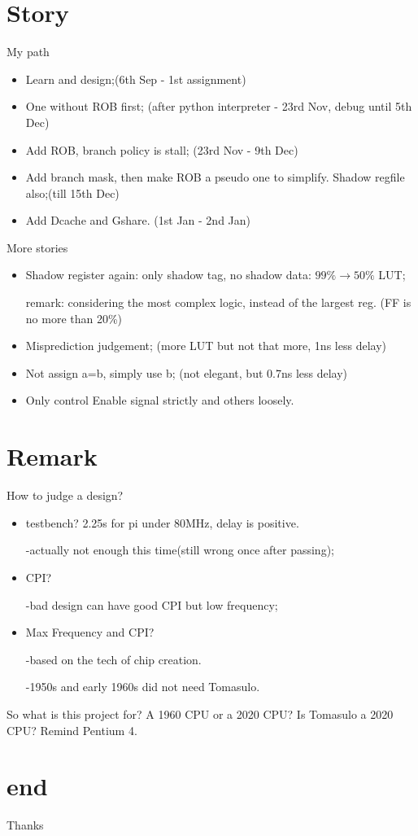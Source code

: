 \documentclass{beamer}
\begin{document}
\section{Story}
\begin{frame}{My path}
    \begin{itemize}
        \item Learn and design;(6th Sep - 1st assignment)
        \item One without ROB first; 
        (after python interpreter - 23rd Nov, debug until 5th Dec)
        \item Add ROB, branch policy is stall; (23rd Nov - 9th Dec)
        \item Add branch mask, then make ROB a pseudo one to simplify. 
        Shadow regfile also;(till 15th Dec) 
        \item Add Dcache and Gshare. (1st Jan - 2nd Jan)
    \end{itemize}
\end{frame}

\begin{frame}{More stories}
    \begin{itemize}
        \item Shadow register again: only shadow tag, no shadow data: $99\%\rightarrow50\%$ LUT; 
        
        remark: considering the most complex logic, instead of the largest reg. (FF is no more than 20\%)

        \item Misprediction judgement; (more LUT but not that more, 1ns less delay)
        \item Not assign a=b, simply use b; (not elegant, but 0.7ns less delay)
        \item Only control Enable signal strictly and others loosely. 
    \end{itemize}
\end{frame}

\section{Remark}
\begin{frame}{How to judge a design?}
    \begin{itemize}
        \item testbench? 2.25s for pi under 80MHz, delay is positive. 
        
        -actually not enough this time(still wrong once after passing);
        \item CPI? 
        
        -bad design can have good CPI but low frequency;

        \item Max Frequency and CPI? 
        
        -based on the tech of chip creation. 

        -1950s and early 1960s did not need Tomasulo. 
    \end{itemize}
    So what is this project for? A 1960 CPU or a 2020 CPU? Is Tomasulo a 2020 CPU? Remind Pentium 4. 
\end{frame}

\section{end}
\begin{frame}
\Huge{\centerline{Thanks}}
\end{frame}
\end{document}
